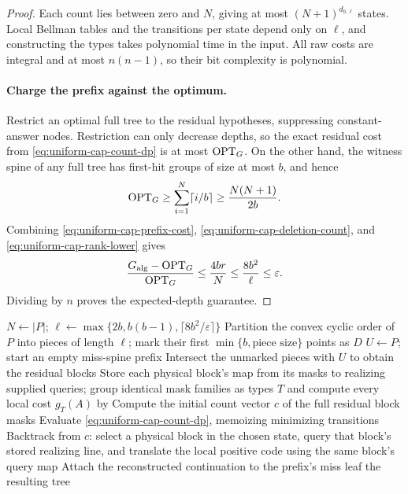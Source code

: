 \begin{proof}
Each count lies between zero and $N$, giving at most
$(N+1)^{d_{b,\ell}}$ states. Local Bellman tables and the transitions per
state depend only on $\ell$, and constructing the types takes
polynomial time in the input. All raw costs are integral and at most
$n(n-1)$, so their bit complexity is polynomial.

\paragraph{Charge the prefix against the optimum.}
Restrict an optimal full tree to the residual hypotheses, suppressing
constant-answer nodes. Restriction can only decrease depths, so the
exact residual cost from \eqref{eq:uniform-cap-count-dp} is at most
$\operatorname{OPT}_G$. On the other hand, the witness spine of any full tree has
first-hit groups of size at most $b$, and hence
\begin{equation}\label{eq:uniform-cap-rank-lower}
 \operatorname{OPT}_G\ge\sum_{i=1}^N\lceil i/b\rceil
          \ge\frac{N(N+1)}{2b}.
\end{equation}
Combining \eqref{eq:uniform-cap-prefix-cost},
\eqref{eq:uniform-cap-deletion-count}, and
\eqref{eq:uniform-cap-rank-lower} gives
\[
 \frac{G_{\rm alg}-\operatorname{OPT}_G}{\operatorname{OPT}_G}
 \le\frac{4br}{N}
 \le\frac{8b^2}{\ell}
 \le\varepsilon.
\]
Dividing by $n$ proves the expected-depth guarantee.
\end{proof}

\begin{algorithm}[H]
\caption{Uniform expected-depth PTAS for bounded convex-position caps}
\label{alg:uniform-cap-ptas}
$N\gets|P|$;
$\ell\gets\max\{2b,b(b-1),\lceil8b^2/\varepsilon\rceil\}$\;
Partition the convex cyclic order of $P$ into pieces of length
$\ell$; mark their first $\min\{b,\text{piece size}\}$ points as $D$\;
$U\gets P$; start an empty miss-spine prefix\;
Intersect the unmarked pieces with $U$ to obtain the residual blocks\;
Store each physical block's map from its masks to realizing supplied
queries; group identical mask families as types $T$ and compute every
local cost $g_T(A)$ by \ExactTree\;
Compute the initial count vector $c$ of the full residual block masks\;
Evaluate \eqref{eq:uniform-cap-count-dp}, memoizing minimizing transitions\;
Backtrack from $c$: select a physical block in the chosen state,
query that block's stored realizing line, and translate the local
positive code using the same block's query map\;
Attach the reconstructed continuation to the prefix's miss leaf\;
\KwRet the resulting tree\;
\end{algorithm}

